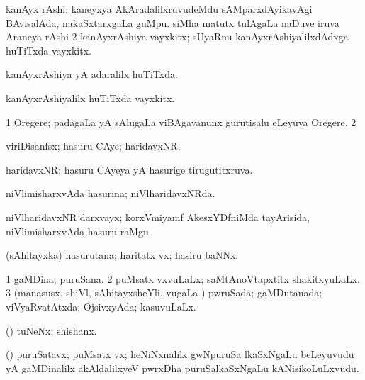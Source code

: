 {{{{{{{{\bentry
{} 
\gl{\nA}
\bmng
\bnum
{} kanAyx rAshi: 
\banum
{} kaneyxya AkAradalilxruvudeMdu sAMparxdAyikavAgi BAvisalAda, nakaSxtarxgaLa guMpu. 
 siMha matutx tulAgaLa naDuve iruva Araneya rAshi  
\eanum
\numie
\num{2} kanAyxrAshiya vayxkitx; sUyaRnu kanAyxrAshiyalilxdAdxga huTiTxda vayxkitx. 
\enum
\emng
\eentry

\bentry
{} 
\gl{\gu}
\expl{}
\bmng
 kanAyxrAshiya yA adaralilx huTiTxda. 
\emng
\eentry

\bentry
{} 
\gl{\nA}
\expl{}
\bmng
 kanAyxrAshiyalilx huTiTxda vayxkitx. 
\emng
\eentry

\bentry
{} 
\gl{\nA}
\expl{}
\bmng
\bnum
\num{1} Oregere; padagaLa yA sAlugaLa viBAgavanunx gurutisalu eLeyuva Oregere. 
\num{2}  
\enum
\emng
\eentry

\bentry
{} 
\gl{\nA}
\expl{}
\bmng
 viriDisanfsx; hasuru CAye; haridavxNR. 
\emng
\eentry

\bentry
{} 
\gl{\gu}
\expl{}
\bmng
 haridavxNR; hasuru CAyeya yA hasurige tirugutitxruva. 
\emng
\eentry

\bentry 
{} 
\gl{\gu}
\expl{}
\bmng
 niVlimisharxvAda hasurina; niVlharidavxNRda. 
\emng
\eentry

\bentry
{} 
\gl{\nA}
\expl{}
\bmng
 niVlharidavxNR darxvayx; korxVmiyamf AkesxYDfniMda tayArisida, niVlimisharxvAda hasuru raMgu. 
\emng
\eentry

\bentry 
{} 
\gl{\nA}
\expl{}
\bmng
 (sAhitayxka) hasurutana; haritatx vx; hasiru baNNx. 
\emng
\eentry

\bentry
{} 
\gl{\gu}
\expl{}
\bmng
\bnum
\num{1} gaMDina; puruSana. 
\num{2} puMsatx vxvuLaLx; saMtAnoVtapxtitx shakitxyuLaLx. 
\num{3} (manasusx, shiVl, sAhitayxsheYli, \mo vugaLa \vi) pwruSada; gaMDutanada; viVyaRvatAtxda; OjsivxyAda; kasuvuLaLx. 
\enum
\emng
\eentry

\bentry 
{}
\gl{\nA}
\expl{}
\bmng
 (\pArxparx) tuNeNx; shishanx. 
\emng
\eentry

\bentry
{} 
\gl{\nA}
\expl{}
\bmng
 (\veYshA) puruSatavx; puMsatx vx; heNiNxnalilx gwNpuruSa lkaSxNgaLu beLeyuvudu yA gaMDinalilx akAldalilxyeV pwrxDha puruSalkaSxNgaLu kANisikoLuLxvudu. 
\emng
\eentry

}}}}}}}}
